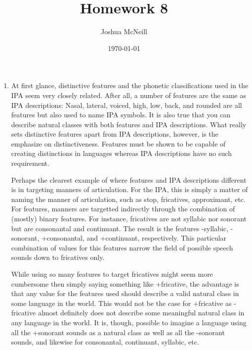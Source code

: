 \documentclass{article}
\author{Joshua McNeill}
\title{Homework 8}
\date{\today}
\begin{document}
  \maketitle
  \begin{enumerate}
    \item At first glance, distinctive features and the phonetic classifications used in the IPA seem very closely related.
    After all, a number of features are the same as IPA descriptions: Nasal, lateral, voiced, high, low, back, and rounded are all features but also used to name IPA symbols.
    It is also true that you can describe natural classes with both features and IPA descriptions.
    What really sets distinctive features apart from IPA descriptions, however, is the emphasize on distinctiveness.
    Features must be shown to be capable of creating distinctions in languages whereas IPA descriptions have no such requirement.

    Perhaps the clearest example of where features and IPA descriptions different is in targeting manners of articulation.
    For the IPA, this is simply a matter of naming the manner of articulation, such as stop, fricatives, approximant, etc.
    For features, manners are targetted indirectly through the combination of (mostly) binary features.
    For instance, fricatives are not syllabic nor sonorant but are consonantal and continuant.
    The result is the features -syllabic, -sonorant, +consonantal, and +continuant, respectively.
    This particular combination of values for this features narrow the field of possible speech sounds down to fricatives only.

    While using so many features to target fricatives might seem more cumbersome then simply saying something like +fricative, the advantage is that any value for the features used should describe a valid natural class in some language in the world.
    This would not be the case for +fricative as -fricative almost definitely does not describe some meaningful natural class in any language in the world.
    It is, though, possible to imagine a language using all the +sonorant sounds as a natural class as well as all the -sonorant sounds, and likewise for consonantal, continuant, syllabic, etc.


\end{enumerate}
\end{document}
